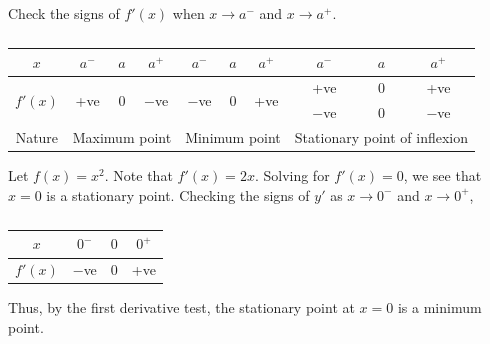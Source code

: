 \begin{recipe}
    Check the signs of $f'(x)$ when $x \to a^-$ and $x \to a^+$.
    \begin{table}[H]
        \centering
        \begin{tabular}{|c|ccc|ccc|ccc|}
            \hline
            $x$ & $a^-$ & $a$ & $a^+$ & $a^-$ & $a$ & $a^+$ & \hspace{1.5em} $a^-$ & \hspace{1em} $a$ & $a^+$ \\ \hline
            \multirow{2}{*}{$f'(x)$} & \multirow{2}{*}{+ve} & \multirow{2}{*}{0} & \multirow{2}{*}{$-$ve} & \multirow{2}{*}{$-$ve} & \multirow{2}{*}{0} & \multirow{2}{*}{+ve} & \hspace{1.5em} +ve & \hspace{1em} 0 & +ve \\ 
             & & & & & & & \hspace{1.5em} $-$ve & \hspace{1em} 0 & $-$ve \\ \hline
            Nature & \multicolumn{3}{c|}{Maximum point} & \multicolumn{3}{c|}{Minimum point} & \multicolumn{3}{c|}{Stationary point of inflexion}\\ \hline
        \end{tabular}
        \caption{}
      \end{table}
\end{recipe}

\begin{example}
    Let $f(x) = x^2$. Note that $f'(x) = 2x$. Solving for $f'(x) = 0$, we see that $x = 0$ is a stationary point. Checking the signs of $y'$ as $x \to 0^-$ and $x \to 0^+$,
    \begin{table}[H]
        \centering
        \begin{tabular}{|c|c|c|c|}
        \hline
        $x$ & $0^-$ & $0$ & $0^+$ \\ \hline
        $f'(x)$ & $-$ve & 0 & +ve \\ \hline
        \end{tabular}
        \caption{}
    \end{table}
    Thus, by the first derivative test, the stationary point at $x = 0$ is a minimum point.
\end{example}

